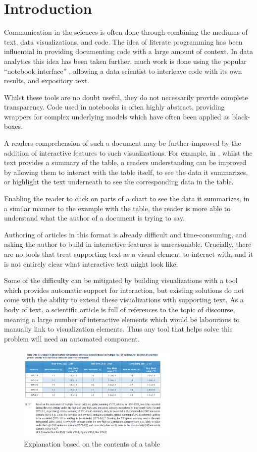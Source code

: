 \section{Introduction}

Communication in the sciences is often done through combining the mediums of text,
data visualizations, and code. The idea of literate programming \cite{knuth84} has
been influential in providing documenting code with a large amount of context. In data
analytics this idea has been taken further, much work is done using
the popular ``notebook interface'' \cite{kluyver16}, allowing a data scientist to 
interleave code with its own results, and expository text. 

Whilst these tools are no doubt useful, they do not necessarily provide complete
transparency. Code used in notebooks is often highly abstract, providing wrappers
for complex underlying models which have often been applied as black-boxes.

A readers comprehension of such a document may be further improved by the addition of
interactive features to such visualizations. For example, in ,
whilst the text provides a summary of the table, a readers understanding can be improved
by allowing them to interact with the table itself, to see the data it summarizes,
or highlight the text underneath to see the corresponding data in the table. 

Enabling the reader to click on parts of a chart to see the data it summarizes, 
in a similar manner to the example with the table, the reader is more able to 
understand what the author of a document is trying to say.

Authoring of articles in this format is already difficult and time-consuming, and asking
the author to build in interactive features is unreasonable. Crucially, there are
no tools that treat supporting text as a visual element to interact with, and it is
not entirely clear what interactive text might look like. 

Some of the difficulty can be mitigated by building visualizations with a tool
which provides automatic support for interaction, but existing solutions do
not come with the ability to extend these visualizations with supporting text.
As a body of text, a scientific article is full of references to the topic of
discourse, meaning a large number of interactive elements which would be labourious to manually
link to visualization elements. Thus any tool that helps solve this problem will need an automated
component.

\begin{figure}[h]
   \includegraphics[width=0.7\textwidth]{fig/ipcc-table-explanation.png}
   \caption{Explanation based on the contents of a table}
   \label{fig:table-explanation}
\end{figure}